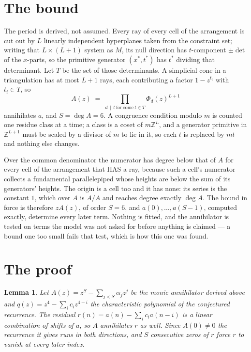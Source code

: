 \documentclass[11pt,a4paper]{article}
\theoremstyle{plain}
\newtheorem{lemma}[theorem]{Lemma}
\theoremstyle{definition}
\begin{document}
\section{The bound}

The period is derived, not assumed. Every ray of every cell of the arrangement is cut out by
$L$ linearly independent hyperplanes taken from the constraint set; writing that $L\times(L+1)$
system as $M$, its null direction has $t$-component $\pm\det$ of the $x$-parts, so the
primitive generator $(x^*,t^*)$ has $t^*$ dividing that determinant. Let $T$ be the set of
those determinants. A simplicial cone in a triangulation has at most $L+1$ rays, each
contributing a factor $1-z^{t_i}$ with $t_i\in T$, so
\[
A(z)\;=\;\prod_{d\,\mid\,t\ \text{for some}\ t\in T}\Phi_d(z)^{L+1}
\]
annihilates $a$, and $S=\deg A=6$. A congruence condition modulo $m$ is counted one residue
class at a time; a class is a coset of $m\mathbb{Z}^L$, and a generator primitive in
$\mathbb{Z}^{L+1}$ must be scaled by a divisor of $m$ to lie in it, so each $t$ is replaced
by $mt$ and nothing else changes.

Over the common denominator the numerator has degree below that of $A$ for every cell of the
arrangement that HAS a ray, because such a cell's numerator collects a fundamental
parallelepiped whose heights are below the sum of its generators' heights. The origin is a cell
too and it has none: its series is the constant $1$, which over $A$ is $A/A$ and reaches degree
exactly $\deg A$. The bound in force is therefore $zA(z)$, of order $S=6$, and
$a(0),\dots,a(S-1)$, computed exactly, determine every later term. Nothing is fitted, and the
annihilator is tested on terms the model was not asked for before anything is claimed --- a
bound one too small fails that test, which is how this one was found.

\section{The proof}

\begin{lemma}\label{lem:crit}
Let $A(z)=z^S-\sum_{j<S}\alpha_jz^{j}$ be the monic annihilator derived above and
$q(z)=z^{4}-\sum_ic_iz^{4-i}$ the characteristic polynomial of the conjectured
recurrence. The residual $r(n)=a(n)-\sum_ic_ia(n-i)$ is a linear combination of shifts of $a$,
so $A$ annihilates $r$ as well. Since $A(0)\ne0$ the recurrence it gives runs in both
directions, and $S$ consecutive zeros of $r$ force $r$ to vanish at every later index.
\end{lemma}
\end{document}
